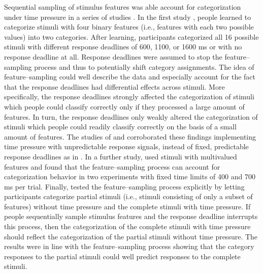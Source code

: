 \documentclass[a4paper,man,natbib]{apa6}
\begin{document}
Sequential sampling of stimulus features was able account for categorization under time pressure in a series of studies \citep{lamberts1995categorization, lamberts1998time, lamberts1999building, lamberts1999categorization, lamberts1997fast}. In the first study \citep{lamberts1995categorization}, people learned to categorize stimuli with four binary features (i.e., features with each two possible values) into two categories. After learning, participants categorized all 16 possible stimuli with different response deadlines of 600, 1100, or 1600 ms or with no response deadline at all. Response deadlines were assumed to stop the feature--sampling process and thus to potentially shift category assignments. The idea of feature--sampling could well describe the data and especially account for the fact that the response deadlines had differential effects across stimuli. More specifically, the response deadlines strongly affected the categorization of stimuli which people could classify correctly only if they processed a large amount of features. In turn, the response deadlines only weakly altered the categorization of stimuli which people could readily classify correctly on the  basis of a small amount of features. The studies of \cite{lamberts1998time} and \cite{lamberts1999categorization} corroborated these findings implementing time pressure with unpredictable response signals, instead of fixed, predictable response deadlines as in \cite{lamberts1995categorization}. In a further study, \cite{lamberts1997fast} used stimuli with multivalued features and found that the feature--sampling process can account for categorization behavior in two experiments with fixed time limits of 400 and 700 ms per trial. Finally, \cite{lamberts1999building} tested the feature--sampling process explicitly by letting participants categorize partial stimuli (i.e., stimuli consisting of only a subset of features) without time pressure and the complete stimuli with time pressure. If people sequentially sample stimulus features and the response deadline interrupts this process, then the categorization of the complete stimuli with time pressure should reflect the categorization of the partial stimuli without time pressure. The results were in line with the feature--sampling process showing that the category responses to the partial stimuli could well predict responses to the complete stimuli.
\end{document}
